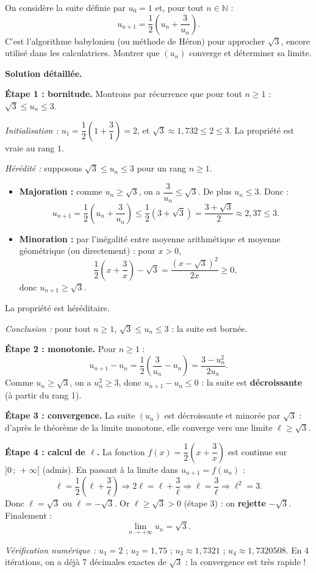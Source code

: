 \documentclass[11pt]{article}
\begin{document}
\begin{exoresolu}
On considère la suite définie par $u_0 = 1$ et, pour tout $n \in \mathbb{N}$ :
\[ u_{n+1} = \frac{1}{2}\left(u_n + \frac{3}{u_n}\right). \]
C'est l'algorithme babylonien (ou méthode de Héron) pour approcher $\sqrt{3}$, encore utilisé dans les calculatrices. Montrer que $(u_n)$ converge et déterminer sa limite.

\tcblower
\textbf{Solution détaillée.}

\textbf{Étape 1 : bornitude.} Montrons par récurrence que pour tout $n \geq 1$ : $\sqrt{3} \leq u_n \leq 3$.

\emph{Initialisation :} $u_1 = \dfrac{1}{2}\left(1 + \dfrac{3}{1}\right) = 2$, et $\sqrt{3} \approx 1{,}732 \leq 2 \leq 3$. La propriété est vraie au rang $1$.

\emph{Hérédité :} supposons $\sqrt{3} \leq u_n \leq 3$ pour un rang $n \geq 1$.
\begin{itemize}
\item \textbf{Majoration :} comme $u_n \geq \sqrt{3}$, on a $\dfrac{3}{u_n} \leq \sqrt{3}$. De plus $u_n \leq 3$. Donc :
      \[ u_{n+1} = \frac{1}{2}\left(u_n + \frac{3}{u_n}\right) \leq \frac{1}{2}\left(3 + \sqrt{3}\right) = \frac{3+\sqrt{3}}{2} \approx 2{,}37 \leq 3. \]
\item \textbf{Minoration :} par l'inégalité entre moyenne arithmétique et moyenne géométrique (ou directement) : pour $x > 0$,
      \[ \frac{1}{2}\left(x + \frac{3}{x}\right) - \sqrt{3} = \frac{(x-\sqrt{3})^2}{2x} \geq 0, \]
      donc $u_{n+1} \geq \sqrt{3}$.
\end{itemize}
La propriété est héréditaire.

\emph{Conclusion :} pour tout $n \geq 1$, $\sqrt{3} \leq u_n \leq 3$ : la suite est bornée.

\textbf{Étape 2 : monotonie.} Pour $n \geq 1$ :
\[ u_{n+1} - u_n = \frac{1}{2}\left(\frac{3}{u_n} - u_n\right) = \frac{3 - u_n^2}{2u_n}. \]
Comme $u_n \geq \sqrt{3}$, on a $u_n^2 \geq 3$, donc $u_{n+1} - u_n \leq 0$ : la suite est \textbf{décroissante} (à partir du rang 1).

\textbf{Étape 3 : convergence.} La suite $(u_n)$ est décroissante et minorée par $\sqrt{3}$ : d'après le théorème de la limite monotone, elle converge vers une limite $\ell \geq \sqrt{3}$.

\textbf{Étape 4 : calcul de $\ell$.} La fonction $f(x) = \dfrac{1}{2}\left(x + \dfrac{3}{x}\right)$ est continue sur $]0\,;\,+\infty[$ (admis). En passant à la limite dans $u_{n+1} = f(u_n)$ :
\[ \ell = \frac{1}{2}\left(\ell + \frac{3}{\ell}\right) \Longrightarrow 2\ell = \ell + \frac{3}{\ell} \Longrightarrow \ell = \frac{3}{\ell} \Longrightarrow \ell^2 = 3. \]
Donc $\ell = \sqrt{3}$ ou $\ell = -\sqrt{3}$. Or $\ell \geq \sqrt{3} > 0$ (étape 3) : on \textbf{rejette} $-\sqrt{3}$. Finalement :
\[ \boxed{\lim_{n \to +\infty} u_n = \sqrt{3}}. \]

\emph{Vérification numérique :} $u_1 = 2$ ; $u_2 = 1{,}75$ ; $u_3 \approx 1{,}7321$ ; $u_4 \approx 1{,}7320508$. En 4 itérations, on a déjà 7 décimales exactes de $\sqrt{3}$ : la convergence est très rapide !
\end{exoresolu}
\end{document}
